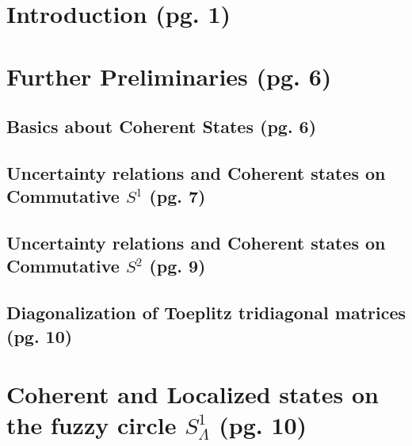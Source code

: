 \documentclass{article}
\begin{document}
\section{Introduction (pg. 1)}

\section{Further Preliminaries (pg. 6)}

\subsection{Basics about Coherent States (pg. 6)}

\subsection{Uncertainty relations and Coherent states on Commutative $S^1$ (pg. 7)}

\subsection{Uncertainty relations and Coherent states on Commutative $S^2$ (pg. 9)}

\subsection{Diagonalization of Toeplitz tridiagonal matrices (pg. 10)}

\section{Coherent and Localized states on the fuzzy circle $S^1_{\Lambda}$ (pg. 10)}
\end{document}
